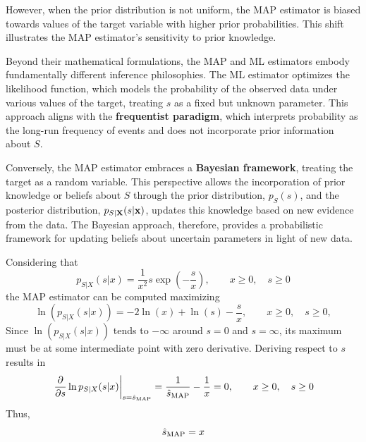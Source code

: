 {However, when the prior distribution is not uniform, the MAP estimator is biased towards values of the target variable with higher prior probabilities. This shift illustrates the MAP estimator's sensitivity to prior knowledge.}

{Beyond their mathematical formulations, the MAP and ML estimators embody fundamentally different inference philosophies. The ML estimator optimizes the likelihood function, which models the probability of the observed data under various values of the target, treating $s$ as a fixed but unknown parameter. This approach aligns with the \textbf{frequentist paradigm}, which interprets probability as the long-run frequency of events and does not incorporate prior information about $S$.}

{Conversely, the MAP estimator embraces a \textbf{Bayesian framework}, treating the target as a random variable. This perspective allows the incorporation of prior knowledge or beliefs about $S$ through the prior distribution, $p_S(s)$, and the posterior distribution, $p_{{S|\bf X}}(s|{\bf x})$, updates this knowledge based on new evidence from the data. The Bayesian approach, therefore, provides a probabilistic framework for updating beliefs about uncertain parameters in light of new data.}

\begin{example}
Considering that  
\begin{equation}
p_{S|X}(s|x) = \frac{1}{x^2} s \exp\left(-\frac{s}{x}\right), \qquad  x\ge 0,\quad s \ge 0
\end{equation}
the MAP estimator can be computed maximizing
\begin{equation}
\ln(p_{S|X}(s|x)) = -2\ln(x) + \ln(s)-\frac{s}{x}, \qquad  x\ge 0,\quad s \ge 0,
\end{equation}
Since $\ln(p_{S|X}(s|x))$ tends to $-\infty$ around $s=0 $ and $s=\infty$, its maximum must be at some intermediate point with zero derivative. Deriving respect to $s$ results in
\begin{equation}
\left.\frac{\partial}{\partial s} \ln p_{S|X}(s|x)\right|_{s=\hat{s}_\text{MAP}} 
	= \frac{1}{\hat{s}_\text{MAP}} - \frac{1}{x} 
	= 0, \qquad  x\ge 0, \quad s \ge 0
\end{equation}
Thus,
\begin{equation}
\hat{s}_\text{MAP} = x
\end{equation}
\end{example}   %

